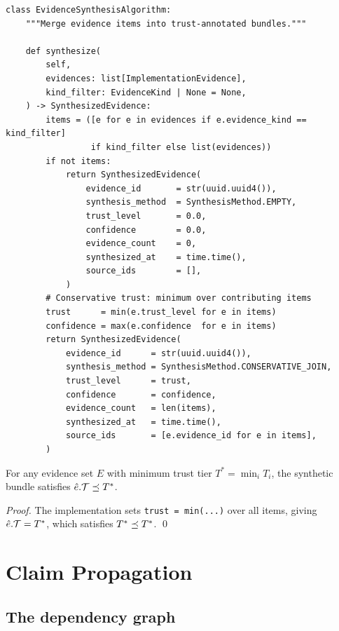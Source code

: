 \documentclass[11pt]{article}
\newcommand{\EvidAlg}{\textsc{EvidSynth}}    %
\begin{document}
\begin{lstlisting}[style=jugeo-python,
  caption={\EvidAlg{} class.},
  label={lst:evid}]
class EvidenceSynthesisAlgorithm:
    """Merge evidence items into trust-annotated bundles."""

    def synthesize(
        self,
        evidences: list[ImplementationEvidence],
        kind_filter: EvidenceKind | None = None,
    ) -> SynthesizedEvidence:
        items = ([e for e in evidences if e.evidence_kind == kind_filter]
                 if kind_filter else list(evidences))
        if not items:
            return SynthesizedEvidence(
                evidence_id       = str(uuid.uuid4()),
                synthesis_method  = SynthesisMethod.EMPTY,
                trust_level       = 0.0,
                confidence        = 0.0,
                evidence_count    = 0,
                synthesized_at    = time.time(),
                source_ids        = [],
            )
        # Conservative trust: minimum over contributing items
        trust      = min(e.trust_level for e in items)
        confidence = max(e.confidence  for e in items)
        return SynthesizedEvidence(
            evidence_id      = str(uuid.uuid4()),
            synthesis_method = SynthesisMethod.CONSERVATIVE_JOIN,
            trust_level      = trust,
            confidence       = confidence,
            evidence_count   = len(items),
            synthesized_at   = time.time(),
            source_ids       = [e.evidence_id for e in items],
        )
\end{lstlisting}

\begin{proposition}\label{prop:trust-attenuation}
For any evidence set $E$ with minimum trust tier
$T^* = \min_i T_i$, the synthetic bundle satisfies
$\hat{e}.\mathcal{T} \preceq T^*$.
\end{proposition}
\begin{proof}
The implementation sets \texttt{trust = min(...)} over all items,
giving $\hat{e}.\mathcal{T} = T^*$, which satisfies $T^* \preceq T^*$.
\qed
\end{proof}

\section{Claim Propagation}\label{sec:prop}

\subsection{The dependency graph}
\end{document}
